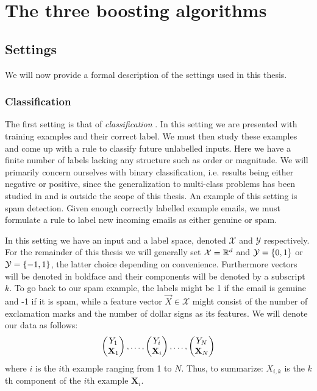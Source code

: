 
\chapter{The three boosting algorithms}
\label{chap:prelim}
\section{Settings}
We will now provide a formal description of the settings used in this thesis.
\subsection{Classification} 
\label{subsec:class}
\par The first setting is that of \textit{classification} \cite{Hastie2009}. In this setting we are presented with training examples and their correct label. We must then study these examples and come up with a rule to classify future unlabelled inputs. Here we have a finite number of labels lacking any structure such as order or magnitude. We will primarily concern ourselves with binary classification, i.e. results being either negative or positive, since the generalization to multi-class problems has been studied in \cite{Freund1997} and is outside the scope of this thesis. An example of this setting is spam detection. Given enough correctly labelled example emails, we must formulate a rule to label new incoming emails as either genuine or spam. 
\par In this setting we have an input and a label space, denoted $\mathcal X$ and $\mathcal Y$ respectively. For the remainder of this thesis we will generally set $\mathcal X = \R^d$ and $\mathcal Y = \set{0,1}$ or $\mathcal Y = \set{-1,1}$, the latter choice depending on convenience. 
Furthermore vectors will be denoted in boldface and their components will be denoted by a subscript $k$. To go back to our spam example, the labels might be 1 if the email is genuine and -1 if it is spam, while a feature vector $\vec X\in \mathcal X$ might consist of the number of exclamation marks and the number of dollar signs as its features. We will denote our data as follows: $$\Vec{Y_1\\ \mathbf X_1},\ldots, \Vec{Y_i\\ \mathbf X_i},\ldots,\Vec{Y_N\\ \mathbf X_N}$$ where $i$ is the $i$th example ranging from 1 to $N$. Thus, to summarize: $X_{i,k}$ is the $k$th component of the $i$th example $\mathbf X_i$. 

